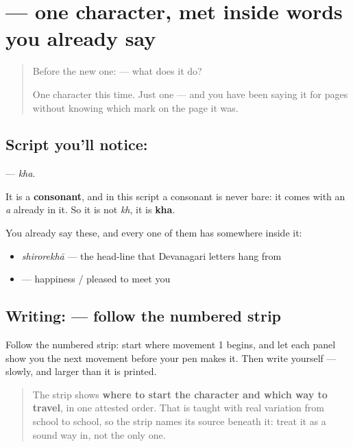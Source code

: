 \section[\texorpdfstring{\hi{ख} (kha)}{ख (kha)}]{ — one character, met inside words you already say}

\label{lesson:HI-S122-letter-kha}



\begin{quote}
Before the new one:  — what does it do?

One character this time. Just one — and you have been saying it for pages without knowing which mark on the page it was.
\end{quote}

\subsection*{Script you'll notice: }
\textbf{} — \emph{kha}.

It is a \textbf{consonant}, and in this script a consonant is never bare: it comes with an \emph{a} already in it. So it is not \emph{kh}, it is \textbf{kha}.

You already say these, and every one of them has  somewhere inside it:

\begin{itemize}
\raggedright
  \item \textbf{} \emph{shirorekhā} — the head-line that Devanagari letters hang from
  \item \textbf{} — happiness / pleased to meet you
\end{itemize}

\subsection*{Writing:  — follow the numbered strip}

Follow the numbered strip: start where movement 1 begins, and let each panel show you the next movement before your pen makes it. Then write  yourself — slowly, and larger than it is printed.

\begin{quote}
The strip shows \textbf{where to start the character and which way to travel}, in one attested order. That is taught with real variation from school to school, so the strip names its source beneath it: treat it as a sound way in, not the only one.
\end{quote}

